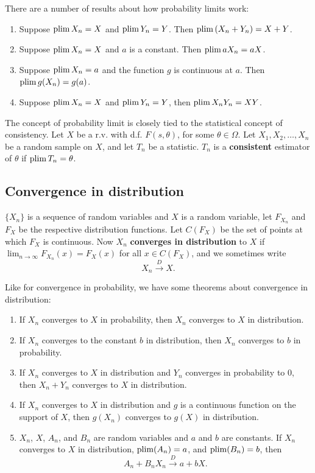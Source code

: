 \documentclass[10pt]{article}
\begin{document}
There are a number of results about how probability limits work:
\begin{enumerate}
\item Suppose $\operatorname{plim} X_n=X$ and $\operatorname{plim} Y_n=Y$. Then $\operatorname{plim} \left(X_n+Y_n\right) = X+Y$.
\item Suppose $\operatorname{plim} X_n=X$ and $a$ is a constant. Then $\operatorname{plim} a X_n = aX$.
\item Suppose $\operatorname{plim} X_n=a$ and the function $g$ is continuous at $a$. Then $\operatorname{plim} g(X_n)=g(a)$.
\item Suppose $\operatorname{plim} X_n=X$ and $\operatorname{plim} Y_n=Y$, then $\operatorname{plim} X_nY_n=XY$.
\end{enumerate}

The concept of probability limit is closely tied to the statistical concept
of consistency. Let $X$ be a r.v. with d.f. $F(s,\theta)$, for some $\theta\in\Omega$.
Let $X_1,X_2,\dots,X_n$ be a random sample on $X$, and let $T_n$ be a statistic.
$T_n$ is a \textbf{consistent} estimator of $\theta$ if $\operatorname{plim} T_n = \theta$.

\subsection{Convergence in distribution}
$\{X_n\}$ is a sequence of random variables and $X$ is a random variable,
let $F_{X_n}$ and $F_X$ be the respective distribution functions. Let 
$C(F_X)$ be the set of points at which $F_X$ is continuous. Now $X_n$ \textbf{converges in
distribution} to $X$ if $\lim_{n\rightarrow\infty} F_{X_n}(x) = F_X(x)$ for all
$x\in C(F_X)$, and we sometimes write \[X_n \xrightarrow{D} X.\]

Like for convergence in probability, we have some theorems about convergence in distribution:

\begin{enumerate}
\item If $X_n$ converges to $X$ in probability, then $X_n$ converges to $X$ in distribution.
\item If $X_n$ converges to the constant $b$ in distribution, then $X_n$
converges to $b$ in probability.
\item If $X_n$ converges to $X$ in distribution and $Y_n$ converges in probability to $0$,
then $X_n+Y_n$ converges to $X$ in distribution.
\item If $X_n$ converges to $X$ in distribution and $g$ is a continuous function on the support
of $X$, then $g(X_n)$ converges to $g(X)$ in distribution.
\item $X_n$, $X$, $A_n$, and $B_n$ are random variables and $a$ and $b$ are constants. 
If $X_n$ converges to $X$ in distribution, $\operatorname{plim}(A_n)=a$, and $\operatorname{plim}(B_n)=b$, then
\[ A_n + B_n X_n \xrightarrow{D} a + bX.\]
\end{enumerate}
\end{document}
